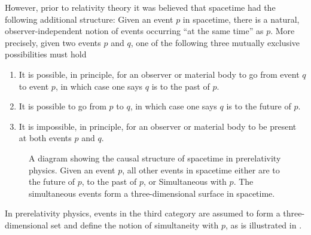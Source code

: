 However, prior to relativity theory it was believed that spacetime had the following additional structure: Given an event $p$ in spacetime, there is a natural, observer-independent notion of events occurring ``at the same time'' as $p$. More precisely, given two events $p$ and $q$, one of the following three mutually exclusive possibilities must hold
\begin{enumerate}[label=(\arabic*)]
    \item It is possible, in principle, for an observer or material body to go from event $q$ to event $p$, in which case one says $q$ is to the past of $p$.
    \item It is possible to go from $p$ to $q$, in which case one says $q$ is to the future of $p$.
    \item It is impossible, in principle, for an observer or material body to be present at both events $p$ and $q$.
\end{enumerate}

\begin{figure}[!ht]
\begin{minipage}{.6\textwidth}
    \centering
\end{minipage}
\hfill
\begin{minipage}{.32\textwidth}
    \caption{A diagram showing the causal structure of spacetime in prerelativity physics. Given an event $p$, all other events in spacetime either are to the future of $p$, to the past of $p$, or Simultaneous with $p$. The simultaneous events form a three-dimensional surface in spacetime.}
    \label{1.1}
\end{minipage}
\end{figure}

In prerelativity physics, events in the third category are assumed to form a three-dimensional set and define the notion of simultaneity with $p$, as is illustrated in .

